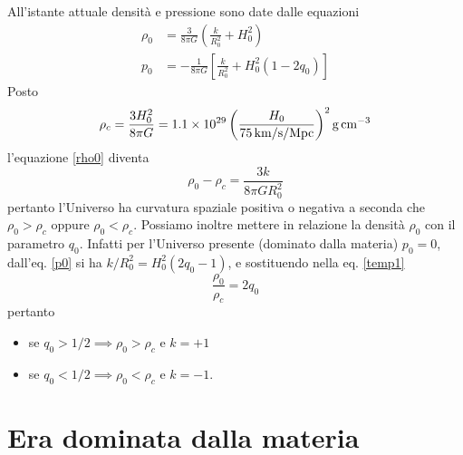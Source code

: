 All'istante attuale densità e pressione sono date dalle equazioni
\begin{subequations}
  \begin{align}
    \rho_0  &= \frac{3}{8 \pi G} \left(\frac{k}{R_0^2} + H_0^2 \right)
    \label{rho0} \\
    p_0 &= -\frac{1}{8 \pi G} \left[\frac {k}{R_0^2}+H_0^2(1-2q_0)\right]
    \label{p0}
  \end{align}
\end{subequations}
Posto
\begin{equation}
  \rho_c = \frac{3 H_0^2}{8 \pi G} = \num{1.1e29}
  \left(
    \frac{H_0}{\SI{75}{\kilo\metre \per \second \per
        \mega\parsec}}
  \right)^2
  \unit{\gram\per\centi\metre\cubed}
  \label{rhoc}
\end{equation}
l'equazione \eqref{rho0} diventa
\begin{equation}
  \rho_0-\rho_c =  \frac{3 k}{8 \pi G R_0^2}
  \label{temp1}
\end{equation}
pertanto l'Universo ha curvatura spaziale positiva o negativa a seconda che
$\rho_0 > \rho_c$ oppure $\rho_0 < \rho_c$.  Possiamo inoltre mettere in
relazione la densità $\rho_0$ con il parametro $q_0$.  Infatti per l'Universo
presente (dominato dalla materia) $p_0=0$, dall'eq. \eqref{p0} si ha
$k/R_0^2 = H_0^2 (2q_0-1)$, e sostituendo nella eq. \eqref{temp1}
\begin{equation}
  \frac {\rho_0} {\rho_c}=2 q_0
  \label{rho0surhoc}
\end{equation}
pertanto
\begin{itemize}
\item se $q_0 > 1/2 \implies \rho_0>\rho_c$ e $k=+1$
\item se $q_0 < 1/2 \implies \rho_0<\rho_c$ e $k=-1$.
\end{itemize}

\section{Era dominata dalla materia}

